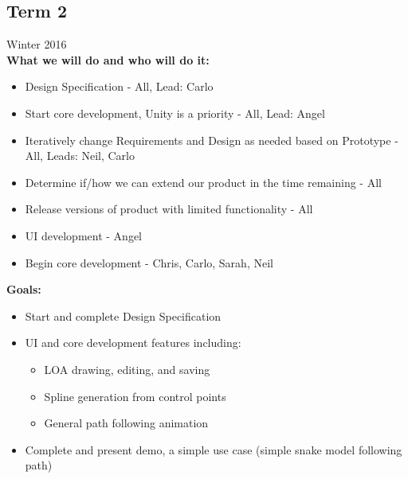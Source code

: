 \subsection{Term 2}
Winter 2016 \\
\textbf{What we will do and who will do it:}
\begin{itemize}
	\item Design Specification - All, Lead: Carlo
	\item Start core development, Unity is a priority - All, Lead: Angel
	\item Iteratively change Requirements and Design as needed based on Prototype - All, Leads: Neil, Carlo
	\item Determine if/how we can extend our product in the time remaining - All
	\item Release versions of product with limited functionality - All
	\item UI development - Angel
	\item Begin core development - Chris, Carlo, Sarah, Neil
\end{itemize} 

\textbf{Goals:}\\
\begin{itemize}
	\item Start and complete Design Specification
	\item UI and core development features including: 
	\begin{itemize}
		\item LOA drawing, editing, and saving
		\item Spline generation from control points
		\item General path following animation
	\end{itemize}
	\item Complete and present demo, a simple use case (simple snake model following path)
\end{itemize}

